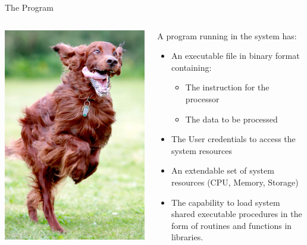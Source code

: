 \documentclass[unknownkeysallowed, 10pt, a4 paper, handout]{beamer}
\begin{document}
\begin{frame}[label=program]{The Program}
  \begin{columns}[T]
    \begin{column}{.23\textwidth}
      \includegraphics[scale=0.15]{pics/running.jpg}
    \end{column}
    \hfill
    \begin{column}{.73\textwidth}
      \small{
      A program running in the system has:
      \begin{itemize}
        \item An executable file in binary format containing:
        \begin{itemize}
          \item The instruction for the processor
          \item The data to be processed
        \end{itemize}
        \item The User credentials to access the system resources
        \item An extendable set of system resources (CPU, Memory, Storage)
        \item The capability to load system shared executable procedures
          in the form of routines and functions in libraries.
      \end{itemize}
    }
    \end{column}
  \end{columns}
\end{frame}
\end{document}
